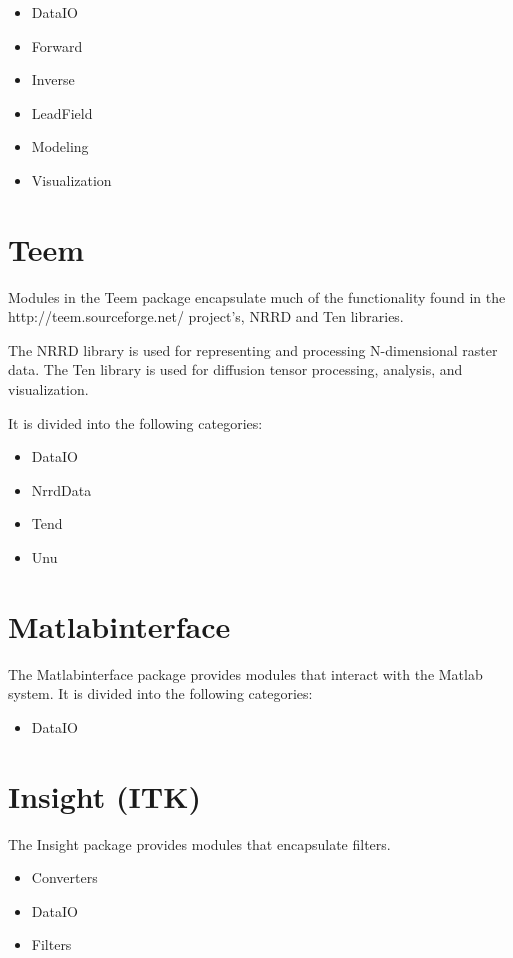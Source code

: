 \begin{itemize}
\item DataIO
\item Forward
\item Inverse
\item LeadField
\item Modeling
\item Visualization
\end{itemize}

\section{Teem}
\label{sec:teempackage}

Modules in the Teem package encapsulate much of the functionality
found in the 
{http://teem.sourceforge.net/} project's, NRRD and Ten libraries.

The NRRD library is used for representing and processing N-dimensional
raster data.  The Ten library is used for diffusion tensor processing,
analysis, and visualization.

It is divided into the following categories:

\begin{itemize}
\item DataIO
\item NrrdData
\item Tend
\item Unu
\end{itemize}

\section{Matlabinterface}
\label{sec:matlabpackage}

The Matlabinterface package provides modules that interact with the
Matlab system.  It is divided into the following categories:

\begin{itemize}
\item DataIO
\end{itemize}

\section{Insight (ITK)}
\label{sec:insightpackage}

The Insight package provides modules that encapsulate
 filters.

\begin{itemize}
\item Converters
\item DataIO
\item Filters
\end{itemize}



